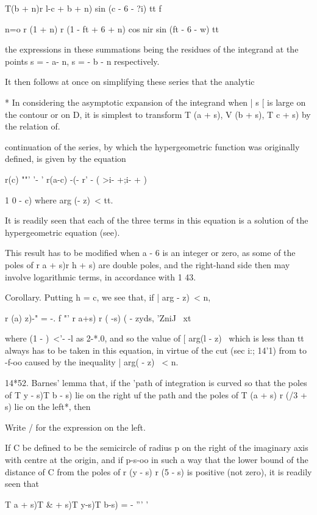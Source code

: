   T(b + n)r l-c + b + n) sin (c - 6 - ?i) tt f \

n=o r (1 + n) r (1 - ft + 6 + n) cos nir sin (ft - 6 - w) tt

the expressions in these summations being the residues of the
integrand at the points s = - a- n, s = - b - n respectively.

It then follows at once on simplifying these series that the analytic

* In considering the asymptotic expansion of the integrand when | s [
is large on the contour or on D, it is simplest to transform T (a +
s), V (b + s), T c + s) by the relation of.

%
%

continuation of the series, by which the hypergeometric function was
originally defined, is given by the equation

r(c) ""' '- ' r(a-c) -(- r' - ( >i- +;i- + )

1 0 - c) where arg (- z)\ < tt.

It is readily seen that each of the three terms in this equation is a
solution of the hypergeometric equation (see).

This result has to be modified when a - 6 is an integer or zero, as
some of the poles of r a + s)r h + s) are double poles, and the
right-hand side then may involve logarithmic terms, in accordance with
1 43.

Corollary. Putting h = c, we see that, if | arg - z)\ < n,

r (a) z)-" = -. f "' r a+s) r ( -s) ( - zyds, 'ZniJ \ xt

where (1 - )~<'- -l as 2-*.0, and so the value of [ arg(l - z) \ which
is less than tt always has to be taken in this equation, in virtue of
the cut (sec i:; 14'1) from to -f-oo caused by the inequality | arg( -
z) \ < n.

14*52. Barnes' lemma that, if the 'path of integration is curved so
that the poles of T y - s)T b - s) lie on the right uf the path and
the poles of T (a + s) r (/3 + s) lie on the left*, then

Write / for the expression on the left.

If C be defined to be the semicircle of radius p on the right of the
imaginary axis with centre at the origin, and if p-s-oo in such a way
that the lower bound of the distance of C from the poles of r (y - s)
r (5 - s) is positive (not zero), it is readily seen that

T a + s)T \& + s)T y-s)T b-s) = - ''' '

